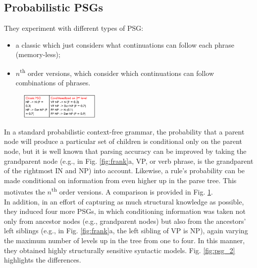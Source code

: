 \subsection{Probabilistic PSGs}
They experiment with different types of PSG:
\begin{itemize}
    \item a classic which just considers what continuations can follow each phrase (memory-less);
\end{itemize}

\begin{itemize}
    \item $n$\textsuperscript{th} order versions, which consider which continuations can follow combinations of phrases.
\end{itemize}

\begin{figure}
  \centering
  \includegraphics[width=0.34\textwidth]{images/psg.png}
  \caption{}
  \label{fig:psg}
\end{figure}

In a standard probabilistic context-free grammar, the probability that a parent node will produce a particular set of children is conditional only on the parent node, but it is well known that parsing accuracy can be improved by taking the grandparent node (e.g., in Fig. \ref{fig:frank}a, VP, or verb phrase, is the grandparent of the rightmost IN and NP) into account. Likewise, a rule's probability can be made conditional on information from even higher up in the parse tree. This motivates the $n$\textsuperscript{th} order versions. A comparison is provided in Fig. \ref{fig:psg}.\\

In addition, in an effort of capturing as much structural knowledge as possible, they induced four more PSGs, in which conditioning information was taken not only from ancestor nodes (e.g., grandparent nodes) but also from the ancestors' left siblings (e.g., in Fig. \ref{fig:frank}a, the left sibling of VP is NP), again varying the maximum number of levels up in the tree from one to four. In this manner, they obtained highly structurally sensitive syntactic models. Fig. \ref{fig:psg_2} highlights the differences.

